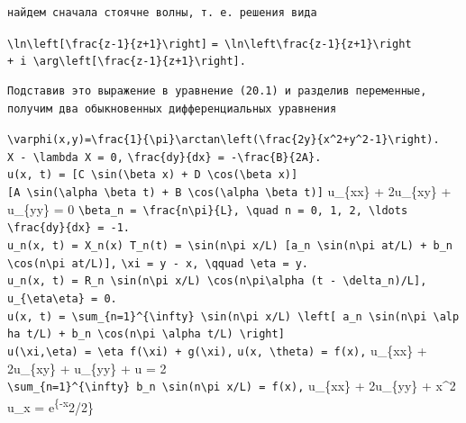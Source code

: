 \documentclass[
  ukrainian,
]{article}
\begin{document}
\begin{verbatim}
найдем сначала стоячне волны, т. е. решения вида
\end{verbatim}

\texttt{\textbackslash{}ln\textbackslash{}left{[}\textbackslash{}frac\{z-1\}\{z+1\}\textbackslash{}right{]}}
\texttt{=\ \textbackslash{}ln\textbackslash{}left\textbar{}\textbackslash{}frac\{z-1\}\{z+1\}\textbackslash{}right\textbar{}}
\texttt{+\ i\ \textbackslash{}arg\textbackslash{}left{[}\textbackslash{}frac\{z-1\}\{z+1\}\textbackslash{}right{]}.}

\begin{verbatim}
Подставив это выражение в уравнение (20.1) и разделив переменные, получим два обыкновенных дифференциальных уравнения
\end{verbatim}

\texttt{\textbackslash{}varphi(x,y)=\textbackslash{}frac\{1\}\{\textbackslash{}pi\}\textbackslash{}arctan\textbackslash{}left(\textbackslash{}frac\{2y\}\{x\^{}2+y\^{}2-1\}\textbackslash{}right).}
\texttt{X\textquotesingle{}\textquotesingle{}\ -\ \textbackslash{}lambda\ X\ =\ 0,}
\texttt{\textbackslash{}frac\{dy\}\{dx\}\ =\ -\textbackslash{}frac\{B\}\{2A\}.}
\texttt{u(x,\ t)\ =\ {[}C\ \textbackslash{}sin(\textbackslash{}beta\ x)\ +\ D\ \textbackslash{}cos(\textbackslash{}beta\ x){]}{[}A\ \textbackslash{}sin(\textbackslash{}alpha\ \textbackslash{}beta\ t)\ +\ B\ \textbackslash{}cos(\textbackslash{}alpha\ \textbackslash{}beta\ t){]}}
u\_\{xx\} + 2u\_\{xy\} + u\_\{yy\} = 0
\texttt{\textbackslash{}beta\_n\ =\ \textbackslash{}frac\{n\textbackslash{}pi\}\{L\},\ \textbackslash{}quad\ n\ =\ 0,\ 1,\ 2,\ \textbackslash{}ldots}
\texttt{\textbackslash{}frac\{dy\}\{dx\}\ =\ -1.}
\texttt{u\_n(x,\ t)\ =\ X\_n(x)\ T\_n(t)\ =\ \textbackslash{}sin(n\textbackslash{}pi\ x/L)\ {[}a\_n\ \textbackslash{}sin(n\textbackslash{}pi\ at/L)\ +\ b\_n\ \textbackslash{}cos(n\textbackslash{}pi\ at/L){]},}
\texttt{\textbackslash{}xi\ =\ y\ -\ x,\ \textbackslash{}qquad\ \textbackslash{}eta\ =\ y.}
\texttt{u\_n(x,\ t)\ =\ R\_n\ \textbackslash{}sin(n\textbackslash{}pi\ x/L)\ \textbackslash{}cos(n\textbackslash{}pi\textbackslash{}alpha\ (t\ -\ \textbackslash{}delta\_n)/L{]},}
\texttt{u\_\{\textbackslash{}eta\textbackslash{}eta\}\ =\ 0.}
\texttt{u(x,\ t)\ =\ \textbackslash{}sum\_\{n=1\}\^{}\{\textbackslash{}infty\}\ \textbackslash{}sin(n\textbackslash{}pi\ x/L)\ \textbackslash{}left{[}\ a\_n\ \textbackslash{}sin(n\textbackslash{}pi\ \textbackslash{}alpha\ t/L)\ +\ b\_n\ \textbackslash{}cos(n\textbackslash{}pi\ \textbackslash{}alpha\ t/L)\ \textbackslash{}right{]}}
\texttt{u(\textbackslash{}xi,\textbackslash{}eta)\ =\ \textbackslash{}eta\ f(\textbackslash{}xi)\ +\ g(\textbackslash{}xi),}
\texttt{u(x,\ \textbackslash{}theta)\ =\ f(x),} u\_\{xx\} + 2u\_\{xy\} +
u\_\{yy\} + u = 2
\texttt{\textbackslash{}sum\_\{n=1\}\^{}\{\textbackslash{}infty\}\ b\_n\ \textbackslash{}sin(n\textbackslash{}pi\ x/L)\ =\ f(x),}
u\_\{xx\} + 2u\_\{yy\} + x\^{}2 u\_x = e\textsuperscript{\{-x}2/2\}
\end{document}
